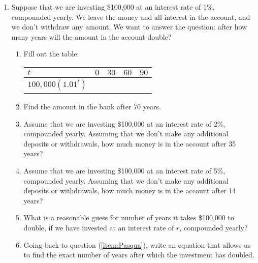 \documentclass[11pt,dvipsnames]{article}
\begin{document}
\begin{enumerate}[label= {\bf  \arabic*:}]
\item Suppose that we are investing \$100,000 at an interest rate of 1\%, compounded yearly. We leave the money and all interest in the account, and we don't withdraw any amount. We want to answer the question: after how many years will the amount in the account double? 
\begin{enumerate}
	\item  Fill out the table:


\begin{minipage}{\linewidth}
\centering

{\setlength{\tabcolsep}{1.9em}  
{\renewcommand{\arraystretch}{2}%
\begin{tabular}{|l|l|l|l|l|}
\hline
$t$    & $0$ & $30$ & $60$ & $90$  \\ \hline
$\displaystyle 100,000\left (1.01^t \right ) $ &      &     &   &\\ \hline
\end{tabular}}} \quad
\end{minipage}


\item  Find the amount in the bank after 70 years.


\item Assume that we are investing \$100,000 at an interest rate of 2\%, compounded yearly. Assuming that we don't make any additional deposits or withdrawals, how much money is in the account after 35 years?


\item  Assume that we are investing \$100,000 at an interest rate of 5\%, compounded yearly. Assuming that we don't make any additional deposits or withdrawals, how much money is in the account after 14 years?

 
\item \label{item:Pasqua} What is a reasonable guess for number of years it takes \$100,000 to double, if we have invested at an interest rate of $r$, compounded yearly? 

 
\item  Going back to question (\ref{item:Pasqua}), write an equation that allows us to find the exact number of years after which the investment has doubled. 
\end{enumerate}
\end{enumerate}
\end{document}
